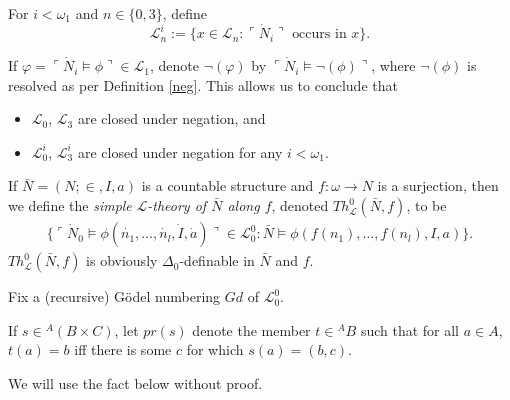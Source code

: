 \documentclass[12pt]{article}
\numberwithin{equation}{section}
\begin{document}
\begin{defi}
For $i < \omega_1$ and $n \in \{0, 3\}$, define 
\begin{equation*}
    \mathcal{L}^i_n := \{x \in \mathcal{L}_n : \ulcorner \dot{N}_i \urcorner \text{ occurs in } x\}.
\end{equation*}
\end{defi}

\begin{con}
If $\varphi = \ulcorner \dot{N}_i \models \phi \urcorner \in \mathcal{L}_1$, denote $\neg(\varphi)$ by $\ulcorner \dot{N}_i \models \neg(\phi) \urcorner$, where $\neg(\phi)$ is resolved as per Definition \ref{neg}. This allows us to conclude that 
\begin{itemize}
    \item $\mathcal{L}_0$, $\mathcal{L}_3$ are closed under negation, and
    \item $\mathcal{L}^i_0$, $\mathcal{L}^i_3$ are closed under negation for any $i < \omega_1$.
\end{itemize}
\end{con}

\begin{defi}
If $\bar{N} = (N; \in, I, a)$ is a countable structure and $f : \omega \longrightarrow N$ is a surjection, then we define the \emph{simple} $\mathcal{L}$\emph{-theory of $\bar{N}$ along $f$}, denoted $Th^{0}_{\mathcal{L}}(\bar{N}, f)$, to be 
\begin{align*}
    \{\ulcorner \dot{N}_0 \models \phi(\dot{n_1}, \ldots, \dot{n_l}, \dot{I}, \dot{a}) \urcorner \in \mathcal{L}^0_0 : \bar{N} \models \phi(f(n_1), \ldots, f(n_l), I, a)\}.
\end{align*}
$Th^{0}_{\mathcal{L}}(\bar{N}, f)$ is obviously $\Delta_0$-definable in $\bar{N}$ and $f$.
\end{defi}

Fix a (recursive) G\"{o}del numbering $Gd$ of $\mathcal{L}^0_0$.

\begin{defi}\label{nota4}
If $s \in {^{A}{(B \times C)}}$, let $pr(s)$ denote the member $t \in {^{A}{B}}$ such that for all $a \in A$, $t(a) = b$ iff there is some $c$ for which $s(a) = (b, c)$.
\end{defi}

We will use the fact below without proof.
\end{document}
